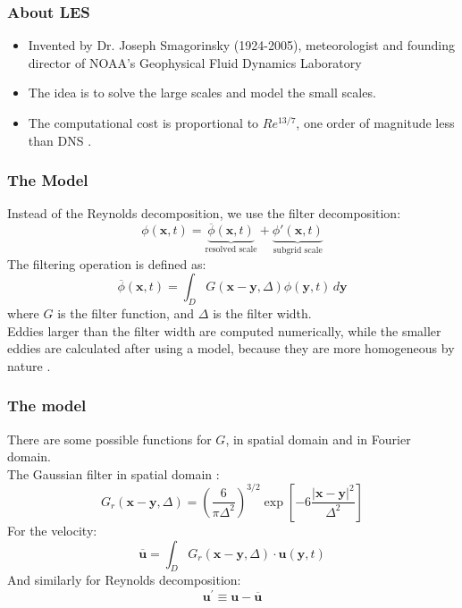 \documentclass{beamer}
\begin{document}
\begin{frame}
  \frametitle{About LES}
  \begin{itemize}
    \item <1-> Invented by Dr. Joseph Smagorinsky (1924-2005), meteorologist and founding director of NOAA’s
     Geophysical Fluid Dynamics Laboratory \cite{zhiyinLargeeddySimulationPresent2015} 
    \item <2-> The idea is to solve the large scales and model the small scales. 
    \item <3-> The computational cost is proportional to $Re^{13/7}$, one order of magnitude less than DNS \cite{choiGridpointRequirementsLarge2012}.
\end{itemize}
\end{frame}
\begin{frame}
  \frametitle{The Model}
  \pause
  Instead of the Reynolds decomposition, we use the filter decomposition:
  \pause
  \begin{equation}
  \phi(\mathbf{x},t) = \underbrace{\overline{\phi}(\mathbf{x},t)}_{\text{resolved scale}}
   + \underbrace{\phi'(\mathbf{x},t)}_{\text{subgrid scale}}
  \end{equation}
  \pause
  The filtering operation is defined as:
\begin{equation}
    \overline{\phi}(\mathbf{x}, t) = \int_D G(\mathbf{x} - \mathbf{y}, \Delta) \phi(\mathbf{y}, t) \, d\mathbf{y}
  \end{equation}
  \pause
  where $G$ is the filter function, and $\Delta$ is the filter width.\\
  \pause
  Eddies larger than the filter width are computed numerically, while the smaller
  eddies are calculated after using a model, because they are more homogeneous by nature \cite{zouLARGEEDDYSIMULATION2006}.
  
\end{frame}
\begin{frame}
\frametitle{The model}
\pause
There are some possible functions for $G$, in spatial domain and in Fourier domain.\\
\pause
The Gaussian filter in spatial domain \cite{zouLARGEEDDYSIMULATION2006}:
\begin{equation}
  G_r(\mathbf{x} - \mathbf{y}, \Delta) = \left( \frac{6}{\pi \Delta^2} \right)^{3/2} 
  \exp \left[ -6 \frac{|\mathbf{x} - \mathbf{y}|^2}{\Delta^2} \right] 
\end{equation}
\pause
For the velocity:
\begin{equation}
  \overline{\mathbf{u}} =\int_D G_r(\mathbf{x} - \mathbf{y}, \Delta) \cdot \mathbf{u}(\mathbf{y},t)
\end{equation}
\pause
And similarly for Reynolds decomposition:
\begin{equation}
  \mathbf{u}^{'} \equiv \mathbf{u}-\overline{\mathbf{u}} 
\end{equation}

\end{frame}
\end{document}
